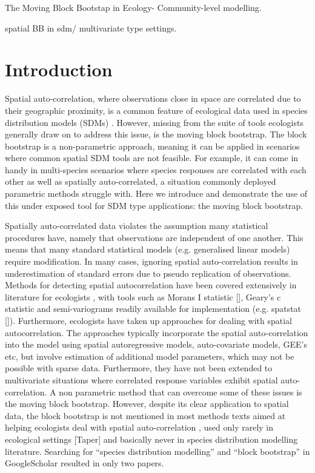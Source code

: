 \documentclass[a4paper,12pt]{article}
\begin{document}
\vspace*{2cm} 
The Moving Block Bootstap in Ecology- Community-level modelling. 
\vspace{1cm}




spatial BB in sdm/ multivariate type settings. 
\section{Introduction}


Spatial auto-correlation, where observations close in space are correlated due to their geographic proximity, is a common feature of ecological data used in species distribution models (SDMs) \citep{taper2004bootstrapping}. However, missing from the suite of tools ecologists generally draw on to address this issue, is the moving block bootstrap. The block bootstrap is a non-parametric approach, meaning it can be applied in scenarios where common spatial SDM tools are not feasible. For example, it can come in handy in multi-species scenarios where species responses are correlated with each other as well as spatially auto-correlated, a situation commonly deployed parametric methods struggle with. Here we introduce and demonstrate the use of this under exposed tool for SDM type applications: the moving block bootstrap.



 
Spatially auto-correlated data violates the assumption many statistical procedures have, namely that observations are independent of one another. This means that many standard statistical models (e.g. generalised linear models) require modification. In many cases, ignoring spatial auto-correlation results in underestimation of standard errors due to pseudo replication of observations. Methods for detecting spatial autocorrelation have been covered extensively in literature for ecologists \citep[e.g][]{f2007methods}, with tools such as Morans I statistic [], Geary’s c statistic and semi-variograms readily available for implementation (e.g. spatstat []). Furthermore, ecologists have taken up approaches for dealing with spatial autocorrelation. The approaches typically incorporate the spatial auto-correlation into the model using spatial autoregressive models, auto-covariate models, GEE’s etc, but involve estimation of additional model parameters, which may not be possible with sparse data. Furthermore, they have not been extended to multivariate situations where correlated response variables exhibit spatial auto-correlation. A non parametric method that can overcome some of these issues is the moving block bootstrap.  However, despite its clear application to spatial data, the block bootstrap is not mentioned in most methods texts aimed at helping ecologists deal with spatial auto-correlation \citep[e.g][]{f2007methods}, used only rarely in ecological settings [Taper] and basically never in species distribution modelling literature. Searching for “species distribution modelling” and “block bootstrap” in GoogleScholar resulted in only two papers. 
\end{document}
